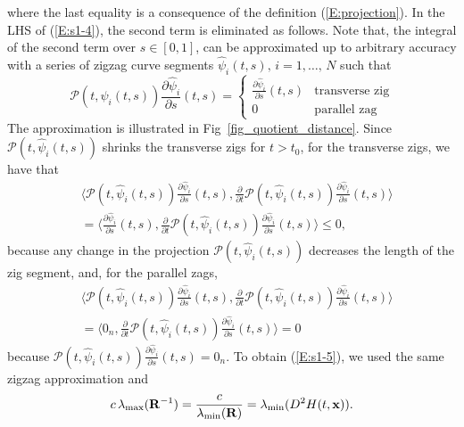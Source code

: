 where the last equality is a consequence of the definition (\ref{E:projection}).
In the LHS of (\ref{E:s1-4}), the second term is eliminated as follows. Note that, the integral of the second term over $s\in [0, 1]$, can be approximated up to arbitrary accuracy with a series of zigzag curve segments $\hat\psi_i(t, s),\, i = 1,\ldots,\, N$ such that
\begin{equation*}
    \mathcal P(t, \hat\psi_i(t, s)) \frac{\partial\hat\psi_i}{\partial s}(t, s) = \begin{cases}
        \frac{\partial\hat\psi_i}{\partial s}(t, s) &\text{transverse zig} \\
        0 &\text{parallel zag}
    \end{cases}
\end{equation*}
The approximation is illustrated in Fig~\ref{fig_quotient_distance}.
Since $\mathcal P(t, \hat\psi_i(t, s))$ shrinks the transverse zigs for $t > t_0$, for the transverse zigs, we have that
\begin{align*}
    &\Big\langle \mathcal P(t, \hat\psi_i(t, s)) \frac{\partial\hat\psi_i}{\partial s}(t, s), \frac{\partial}{\partial t} \mathcal P(t, \hat\psi_i(t, s)) \frac{\partial\hat\psi_i}{\partial s}(t, s) \Big\rangle \\
    &= \Big\langle \frac{\partial\hat\psi_i}{\partial s}(t, s), \frac{\partial}{\partial t} \mathcal P(t, \hat\psi_i(t, s)) \frac{\partial\hat\psi_i}{\partial s}(t, s) \Big\rangle\leq 0,
\end{align*}
because any change in the projection $\mathcal P(t, \hat\psi_i(t, s))$ decreases the length of the zig segment,
and, for the parallel zags,
\begin{align*}
    &\Big\langle \mathcal P(t, \hat\psi_i(t, s)) \frac{\partial\hat\psi_i}{\partial s}(t, s), \frac{\partial}{\partial t} \mathcal P(t, \hat\psi_i(t, s)) \frac{\partial\hat\psi_i}{\partial s}(t, s) \Big\rangle \\
    &= \Big\langle 0_n, \frac{\partial}{\partial t} \mathcal P(t, \hat\psi_i(t, s)) \frac{\partial\hat\psi_i}{\partial s}(t, s) \Big\rangle = 0
\end{align*}
because $\mathcal P(t, \hat\psi_i(t, s)) \frac{\partial\hat\psi_i}{\partial s}(t, s) = 0_n$.
To obtain (\ref{E:s1-5}), we used the same zigzag approximation and
\begin{equation*}
    c\, \lambda_{\max}(\mathbf{R}^{-1}) = \frac{c}{\lambda_{\min}(\mathbf{R})} = \lambda_{\min}(D^2 H(t, \mathbf{x})).
\end{equation*}


